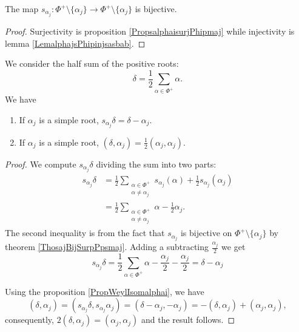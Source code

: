 \begin{theorem}      \label{ThosajBijSurpPpsmaj}
    The map \( s_{\alpha_j}\colon \Phi^+\setminus\{ \alpha_j \}\to \Phi^+\setminus\{ \alpha_j \}\) is bijective.
\end{theorem}

\begin{proof}
    Surjectivity is proposition \ref{PropsalphaisurjPhipmaj} while injectivity is lemma \ref{LemalphajsPhipinjsasbab}.
\end{proof}

\begin{lemma}
    We consider the half sum of the positive roots:
    \begin{equation}
        \delta=\frac{ 1 }{2}\sum_{\alpha\in\Phi^+}\alpha.
    \end{equation}
    We have
    \begin{enumerate}
        \item
            If \( \alpha_j\) is a simple root, \( s_{\alpha_j}\delta=\delta-\alpha_j\).
        \item
            If \( \alpha_j\) is a simple root, \( (\delta,\alpha_j)=\frac{ 1 }{2}(\alpha_j,\alpha_j)\).
    \end{enumerate}    
\end{lemma}

\begin{proof}
    We compute \( s_{\alpha_j}\delta\) dividing the sum into two parts:
    \begin{subequations}
        \begin{align}
            s_{\alpha_j}\delta&=\frac{ 1 }{2}\sum_{\substack{\alpha\in\Phi^+\\\alpha\neq\alpha_j}}s_{\alpha_j}(\alpha)+\frac{ 1 }{2}s_{\alpha_j}(\alpha_j)\\
            &=\frac{ 1 }{2}\sum_{\substack{\alpha\in\Phi^+\\\alpha\neq\alpha_j}}\alpha-\frac{ 1 }{2}\alpha_j.
        \end{align}
    \end{subequations}
    The second inequality is from the fact that \( s_{\alpha_j}\) is bijective on \( \Phi^+\setminus\{ \alpha_j \}\) by theorem \ref{ThosajBijSurpPpsmaj}. Adding a subtracting \( \frac{ \alpha_j }{2}\) we get
    \begin{equation}
        s_{\alpha_j}\delta=\frac{ 1 }{2}\sum_{\alpha\in\Phi^+}\alpha-\frac{ \alpha_j }{2}-\frac{ \alpha_j }{2}=\delta-\alpha_j
    \end{equation}

    Using the proposition \ref{PropWeylIsomalphai}, we have
    \begin{equation}
        (\delta,\alpha_j)=(s_{\alpha_j}\delta,s_{\alpha_j}\alpha_j)=(\delta-\alpha_j,-\alpha_j)=-(\delta,\alpha_j)+(\alpha_j,\alpha_j),
    \end{equation}
    consequently, \( 2(\delta,\alpha_j)=(\alpha_j,\alpha_j)\) and the result follows.
\end{proof}

